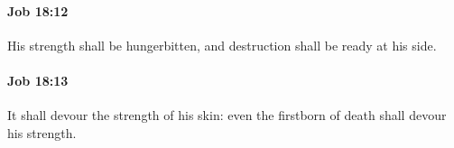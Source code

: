 		\paragraph{Job 18:12} %
			\label{JOB-18-12}

			His strength shall be hungerbitten, and destruction shall be ready at his side.


		\paragraph{Job 18:13} %
			\label{JOB-18-13}

			It shall devour the strength of his skin: even the firstborn of death shall devour his strength.


